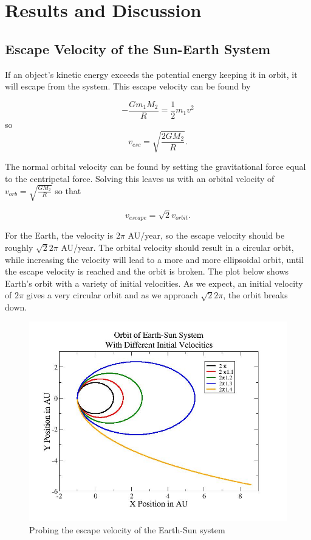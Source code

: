 \documentclass[%
oneside,                 %
final,                   %
10pt]{article}
\begin{document}
\section{Results and Discussion}


\subsection{Escape Velocity of the Sun-Earth System}

If an object's kinetic energy exceeds the potential energy keeping it in orbit, it will escape from the system.  This escape velocity can be found by

\[
-\frac{G m_1 M_2}{R}=\frac{1}{2}m_1 v^2
\]
so 
\[
v_{esc}=\sqrt{\frac{2GM_2}{R}}.
\]

The normal orbital velocity can be found by setting the gravitational force equal to the centripetal force.  Solving this leaves us with an orbital velocity of $v_{orb}=\sqrt{\frac{GM_2}{R}}$ so that

\[
v_{escape}=\sqrt{2}v_{orbit}.
\]

For the Earth, the velocity is $2 \pi$ AU/year, so the escape velocity should be roughly $\sqrt{2}2\pi$ AU/year.  The orbital velocity should result in a circular orbit, while increasing the velocity will lead to a more and more ellipsoidal orbit, until the escape velocity is reached and the orbit is broken.  The plot below shows Earth's orbit with a variety of initial velocities.  As we expect, an initial velocity of $2 \pi$ gives a very circular orbit and as we approach $\sqrt{2}2\pi$, the orbit breaks down.

\begin{figure}[H]\label{fig:velrplot}
  \centering
    \includegraphics[width=1.1\textwidth]{escape.jpg}
    \caption{Probing the escape velocity of the Earth-Sun system}
\end{figure}
\end{document}
